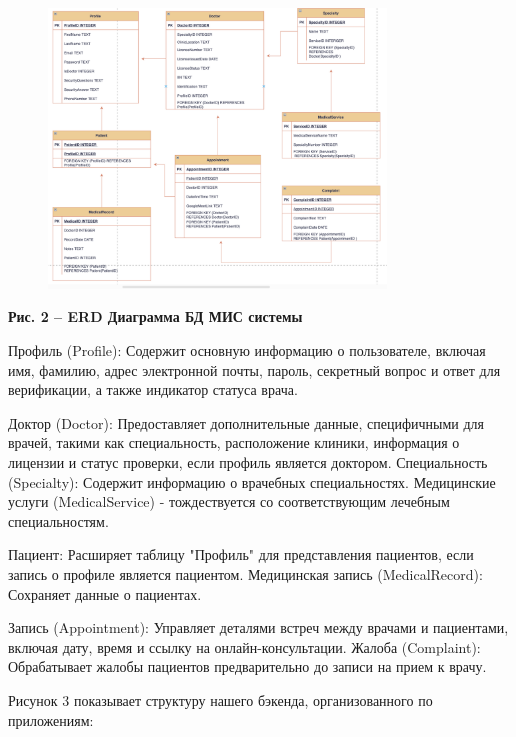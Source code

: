 \begin{figure}[H]
	\centering
	\includegraphics[width=0.8\textwidth]{assets/152}
	\caption*{}
\end{figure}

{\bfseries Рис. 2 -- ERD Диаграмма БД МИС системы}

Профиль (Profile): Содержит основную информацию о пользователе, включая
имя, фамилию, адрес электронной почты, пароль, секретный вопрос и ответ
для верификации, а также индикатор статуса врача.

Доктор (Doctor): Предоставляет дополнительные данные, специфичными для
врачей, такими как специальность, расположение клиники, информация о
лицензии и статус проверки, если профиль является доктором.
Специальность (Specialty): Содержит информацию о врачебных
специальностях. Медицинские услуги (MedicalService) - тождествуется со
соответствующим лечебным специальностям.

Пациент: Расширяет таблицу "Профиль" для представления пациентов, если
запись о профиле является пациентом. Медицинская запись (MedicalRecord):
Сохраняет данные о пациентах.

Запись (Appointment): Управляет деталями встреч между врачами и
пациентами, включая дату, время и ссылку на онлайн-консультации. Жалоба
(Complaint): Обрабатывает жалобы пациентов предварительно до записи на
прием к врачу.

Рисунок 3 показывает структуру нашего бэкенда, организованного по
приложениям:


